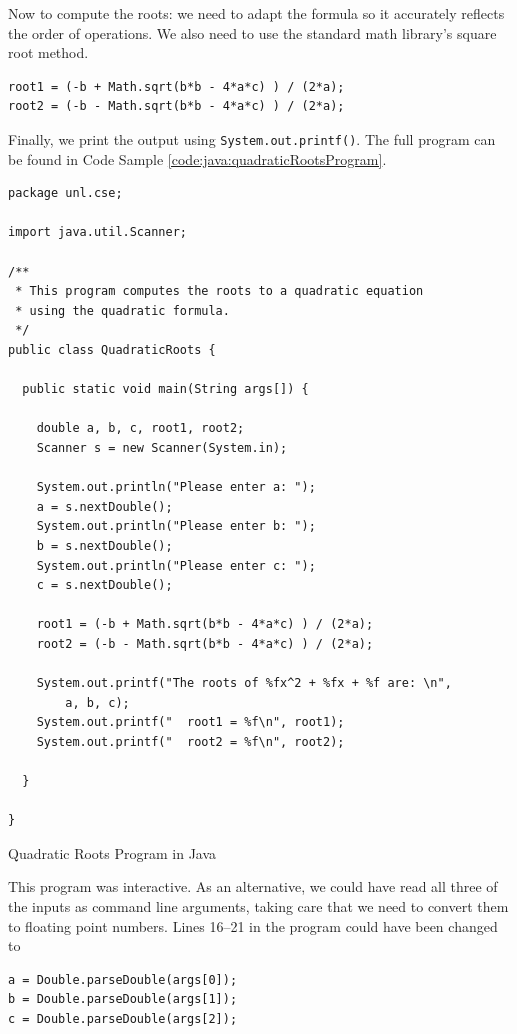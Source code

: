 Now to compute the roots: we need to adapt the
formula so it accurately reflects the order of operations.  We also need to use
the standard math library's square root method.

\begin{verbatim}
root1 = (-b + Math.sqrt(b*b - 4*a*c) ) / (2*a);
root2 = (-b - Math.sqrt(b*b - 4*a*c) ) / (2*a);
\end{verbatim}

Finally, we print the output using \texttt{System.out.printf()}.  The full program 
can be found in Code Sample \ref{code:java:quadraticRootsProgram}.

\begin{listing}[h]
\begin{verbatim}
package unl.cse;

import java.util.Scanner;

/**
 * This program computes the roots to a quadratic equation
 * using the quadratic formula.
 */
public class QuadraticRoots {

  public static void main(String args[]) {
	  
    double a, b, c, root1, root2;
    Scanner s = new Scanner(System.in);

    System.out.println("Please enter a: ");
    a = s.nextDouble();
    System.out.println("Please enter b: ");
    b = s.nextDouble();
    System.out.println("Please enter c: ");
    c = s.nextDouble();
	  
    root1 = (-b + Math.sqrt(b*b - 4*a*c) ) / (2*a);
    root2 = (-b - Math.sqrt(b*b - 4*a*c) ) / (2*a);
	  
    System.out.printf("The roots of %fx^2 + %fx + %f are: \n", 
    	a, b, c);
    System.out.printf("  root1 = %f\n", root1);
    System.out.printf("  root2 = %f\n", root2);

  }

}
\end{verbatim}
\caption{Quadratic Roots Program in Java}
\label{code:java:quadraticRootsProgram}
\end{listing}

This program was interactive.  As an alternative, we could have read 
all three of the inputs as command line arguments, taking care that we
need to convert them to floating point numbers.  Lines 16--21 in the
program could have been changed to 

\begin{verbatim}
a = Double.parseDouble(args[0]);
b = Double.parseDouble(args[1]);
c = Double.parseDouble(args[2]);
\end{verbatim}

